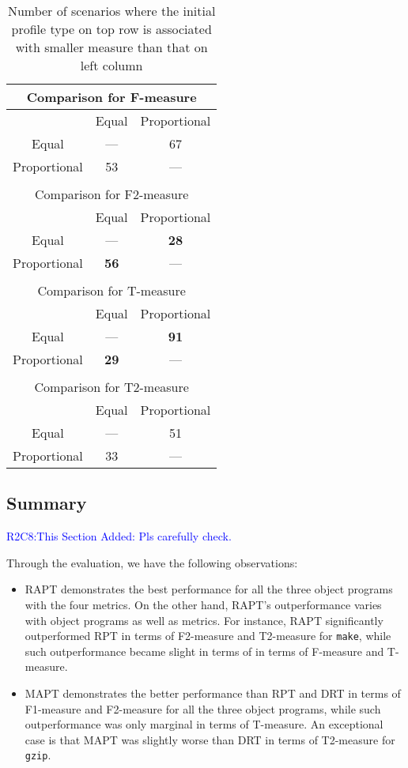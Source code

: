 \documentclass[10pt,journal,compsoc]{IEEEtran}
\begin{document}
\begin{table}
\caption{Number of scenarios where the initial profile type on top row is associated with smaller measure than that on left column}
\label{tab:Psta}
\centering
\begin{tabular}{|c|c|c|}
\multicolumn{3}{c}{Comparison for F-measure} \\ \hline
						& Equal				& Proportional	\\ \hline
Equal					& ---				& 67			\\ \hline
Proportional	        & 53				& ---			\\ \hline
\multicolumn{3}{c}{ } \\
\multicolumn{3}{c}{Comparison for F2-measure} \\ \hline
					& Equal			& Proportional	\\ \hline
Equal				& ---			& \textbf{28}	\\ \hline
Proportional	    & \textbf{56}	& ---			\\ \hline
\multicolumn{3}{c}{ } \\
\multicolumn{3}{c}{Comparison for T-measure} \\ \hline
						& Equal			& Proportional	\\ \hline
Equal					& ---			& \textbf{91}	\\ \hline
Proportional	       	& \textbf{29}	& ---			\\ \hline
\multicolumn{3}{c}{ } \\
\multicolumn{3}{c}{Comparison for T2-measure} \\ \hline
						& Equal				& Proportional	\\ \hline
Equal					& ---				& 51			\\ \hline
Proportional	       	& 33					& ---			\\ \hline
\end{tabular}
\end{table}



\subsection{Summary }
\textcolor{blue}{R2C8:This Section Added: Pls carefully check.}

Through the evaluation, we have the following observations:
\begin{itemize}
\item RAPT demonstrates the best performance for all the three object programs with the four metrics. On the other hand, RAPT's outperformance varies with object programs as well as metrics. For instance, RAPT significantly outperformed RPT in terms of F2-measure and T2-measure for \texttt{make}, while such outperformance became slight in terms of in terms of F-measure and T-measure.
\item MAPT demonstrates the better performance than RPT and DRT in terms of F1-measure and F2-measure for all the three object programs, while such outperformance was only marginal in terms of T-measure. An exceptional case is that MAPT was slightly worse than DRT in terms of T2-measure for \texttt{gzip}.
\end{itemize}
\end{document}
